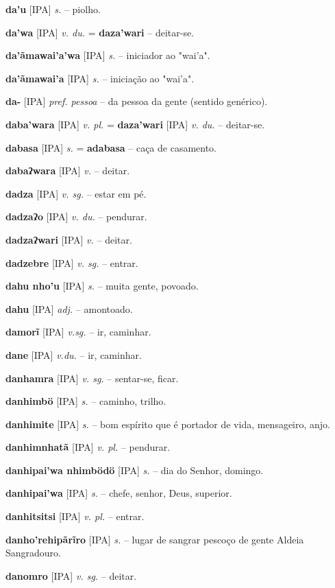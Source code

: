 \textbf{da'u} [IPA] \textit{s.} -- piolho.

\textbf{da'wa} [IPA] \textit{v. du.} = \textbf{daza'wari} -- deitar-se.

\textbf{da'ãmawai'a'wa} [IPA] \textit{s.} -- iniciador ao "wai'a".

\textbf{da'ãmawai'a} [IPA] \textit{s.} -- iniciação ao "wai'a".

\textbf{da-} [IPA] \textit{pref. pessoa} -- da pessoa  da gente (sentido genérico).

\textbf{daba'wara} [IPA] \textit{v. pl.} = \textbf{daza'wari} [IPA] \textit{v. du.} -- deitar-se.

\textbf{dabasa} [IPA] \textit{s.} = \textbf{adabasa} -- caça de casamento.

\textbf{dabaʔwara} [IPA] \textit{v.} -- deitar.

\textbf{dadza} [IPA] \textit{v. sg.} -- estar em pé.

\textbf{dadzaʔo} [IPA] \textit{v. du.} -- pendurar.

\textbf{dadzaʔwari} [IPA] \textit{v.} -- deitar.

\textbf{dadzebre} [IPA] \textit{v. sg.} -- entrar.

\textbf{dahu nho'u} [IPA] \textit{s.} -- muita gente, povoado.

\textbf{dahu} [IPA] \textit{adj.} -- amontoado.

\textbf{damorĩ} [IPA] \textit{v.sg.} -- ir, caminhar.

\textbf{dane} [IPA] \textit{v.du.} -- ir, caminhar.

\textbf{danhamra} [IPA] \textit{v. sg.} -- sentar-se, ficar.

\textbf{danhimbö} [IPA] \textit{s.} -- caminho, trilho.

\textbf{danhimite} [IPA] \textit{s.} -- bom espírito que é portador de vida, mensageiro, anjo.

\textbf{danhimnhatã} [IPA] \textit{v. pl.} -- pendurar.

\textbf{danhipai'wa nhimbödö} [IPA] \textit{s.} -- dia do Senhor, domingo.

\textbf{danhipai'wa} [IPA] \textit{s.} -- chefe, senhor, Deus, superior.

\textbf{danhitsitsi} [IPA] \textit{v. pl.} -- entrar.

\textbf{danho'rehipãrĩro} [IPA] \textit{s.} -- lugar de sangrar pescoço de gente  Aldeia Sangradouro.

\textbf{danomro} [IPA] \textit{v. sg.} -- deitar.

